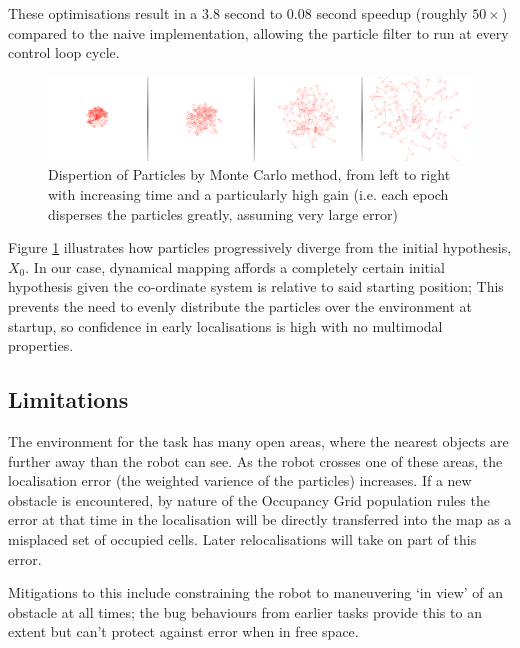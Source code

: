 \documentclass[11pt, a4paper]{article}
\begin{document}
These optimisations result in a 3.8 second to 0.08 second speedup (roughly $50\times$) compared to
the naive implementation, allowing the particle filter to run at every control loop cycle.

\begin{figure}[h]
  \includegraphics[width=\textwidth]{../assets/particle-disperse-random.png}
  \caption{
    \label{fig:particle-disperse}
    Dispertion of Particles by Monte Carlo method, from left to right with increasing time and 
    a particularly high gain (i.e. each epoch disperses the particles greatly, assuming very large error)
  }
\end{figure}

Figure \ref{fig:particle-disperse} illustrates how particles progressively diverge from the initial 
hypothesis, ${X_0}$. In our case, dynamical mapping affords a completely certain initial hypothesis
given the co-ordinate system is relative to said starting position; This prevents the need to
evenly distribute the particles over the environment at startup, so confidence in early localisations
is high with no multimodal properties.

\subsection{Limitations}

The environment for the task has many open areas, where the nearest objects are further away
than the robot can see. As the robot crosses one of these areas, the localisation error (the 
weighted varience of the particles) increases. If a new obstacle is encountered, by nature of the 
Occupancy Grid population rules the error at that time in the localisation will be directly transferred 
into the map as a misplaced set of occupied cells. Later relocalisations will take on part of this error.

Mitigations to this include constraining the robot to maneuvering `in view' of an obstacle at all times;
the bug behaviours from earlier tasks provide this to an extent but can't protect against error
when in free space.


\end{document}
